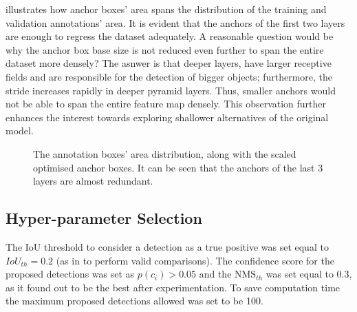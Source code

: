   illustrates how anchor boxes' area spans the distribution of the training and validation annotations' area. It is evident that the anchors of the first two layers are enough to regress the dataset adequately. A reasonable question would be why the anchor box base size is not reduced even further to span the entire dataset more densely? The asnwer is that deeper layers, have larger receptive fields and are responsible for the detection of bigger objects; furthermore, the stride increases rapidly in deeper pyramid layers. Thus, smaller anchors would not be able to span the entire feature map densely. This observation further enhances the interest towards exploring shallower alternatives of the original model.
 
\begin{figure}[!htb]
  \centering
  \caption{The annotation boxes' area distribution, along with the scaled optimised anchor boxes. It can be seen that the anchors of the last 3 layers are almost redundant.}
  \label{fig2}
\end{figure}

\subsection{Hyper-parameter Selection}
The IoU threshold to consider a detection as a true positive was set equal to $IoU_{th} = 0.2$ (as in \cite{bargoti2017deep} to perform valid comparisons). The confidence score for the proposed detections was set as $p(c_i) > 0.05$ and the $\text{NMS}_{th}$ was set equal to 0.3, as it found out to be the best after experimentation. To save computation time the maximum proposed detections allowed was set to be 100. 

